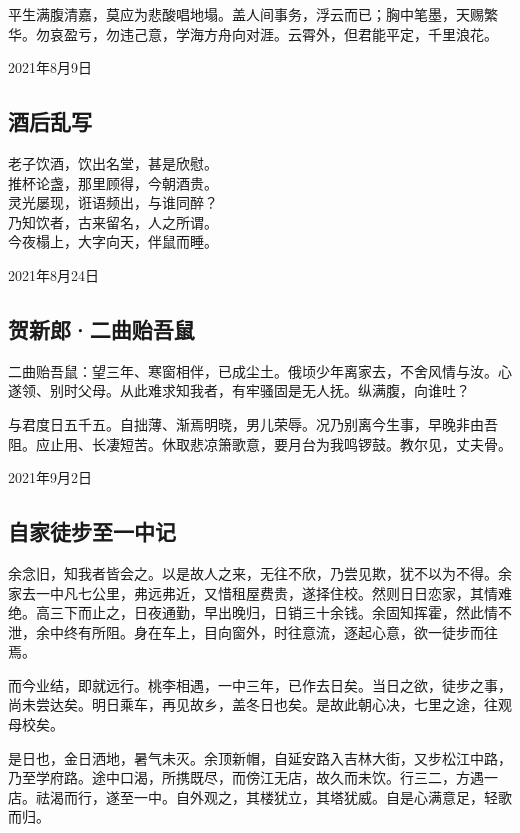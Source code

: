 \documentclass[a5paper]{ctexart}
\begin{document}
	平生满腹清嘉，莫应为悲酸唱地塌。盖人间事务，浮云而已；胸中笔墨，天赐繁华。勿哀盈亏，勿违己意，学海方舟向对涯。云霄外，但君能平定，千里浪花。
	\begin{flushright}
		2021年8月9日
	\end{flushright}
	
	\subsection{酒后乱写}
	\begin{center}
		老子饮酒，饮出名堂，甚是欣慰。\\
		推杯论盏，那里顾得，今朝酒贵。\\
		灵光屡现，诳语频出，与谁同醉？\\
		乃知饮者，古来留名，人之所谓。\\
		今夜榻上，大字向天，伴鼠而睡。
	\end{center}
	\hfill 2021年8月24日
	
	
	\subsection{贺新郎·二曲贻吾鼠}
	二曲贻吾鼠：望三年、寒窗相伴，已成尘土。俄顷少年离家去，不舍风情与汝。心遂领、别时父母。从此难求知我者，有牢骚固是无人抚。纵满腹，向谁吐？
	
	与君度日五千五。自拙薄、渐焉明晓，男儿荣辱。况乃别离今生事，早晚非由吾阻。应止用、长凄短苦。休取悲凉箫歌意，要月台为我鸣锣鼓。教尔见，丈夫骨。
	\begin{flushright}
		2021年9月2日
	\end{flushright}
	
	\subsection{自家徒步至一中记}
	余念旧，知我者皆会之。以是故人之来，无往不欣，乃尝见欺，犹不以为不得。余家去一中凡七公里，弗远弗近，又惜租屋费贵，遂择住校。然则日日恋家，其情难绝。高三下而止之，日夜通勤，早出晚归，日销三十余钱。余固知挥霍，然此情不泄，余中终有所阻。身在车上，目向窗外，时往意流，逐起心意，欲一徒步而往焉。
	
	而今业结，即就远行。桃李相遇，一中三年，已作去日矣。当日之欲，徒步之事，尚未尝达矣。明日乘车，再见故乡，盖冬日也矣。是故此朝心决，七里之途，往观母校矣。
	
	是日也，金日洒地，暑气未灭。余顶新帽，自延安路入吉林大街，又步松江中路，乃至学府路。途中口渴，所携既尽，而傍江无店，故久而未饮。行三二，方遇一店。祛渴而行，遂至一中。自外观之，其楼犹立，其塔犹威。自是心满意足，轻歌而归。
	
\end{document}
